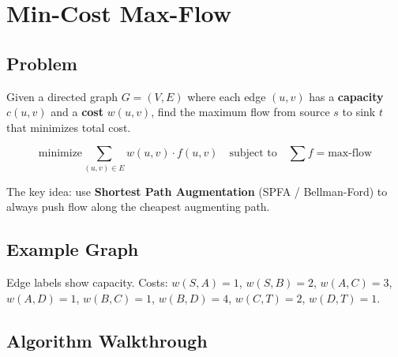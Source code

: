 \section{Min-Cost Max-Flow}

\subsection{Problem}

Given a directed graph $G = (V, E)$ where each edge $(u, v)$ has a \textbf{capacity} $c(u,v)$ and a \textbf{cost} $w(u,v)$, find the maximum flow from source $s$ to sink $t$ that minimizes total cost.

$$\text{minimize} \sum_{(u,v) \in E} w(u,v) \cdot f(u,v) \quad \text{subject to} \quad \sum f = \text{max-flow}$$

The key idea: use \textbf{Shortest Path Augmentation} (SPFA / Bellman-Ford) to always push flow along the cheapest augmenting path.

\subsection{Example Graph}

\begin{diagram}[id="mcmf-graph", label="MCMF Network"]
\end{diagram}

Edge labels show capacity. Costs: $w(S,A)=1$, $w(S,B)=2$, $w(A,C)=3$, $w(A,D)=1$, $w(B,C)=1$, $w(B,D)=4$, $w(C,T)=2$, $w(D,T)=1$.

\subsection{Algorithm Walkthrough}

